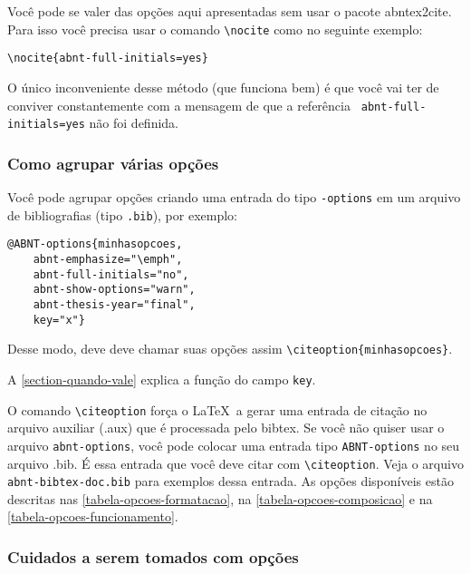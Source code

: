 \documentclass[a4paper]{ltxdoc}
\begin{document}
\DescribeMacro{\nocite}
Você pode se valer das opções aqui apresentadas sem usar o pacote
\textsf{abntex2cite}. Para isso você precisa usar o comando \verb+\nocite+ como
no seguinte exemplo:

\begin{verbatim}
\nocite{abnt-full-initials=yes}
\end{verbatim}

O único inconveniente desse método (que funciona bem) é que você vai ter de
conviver constantemente com a mensagem de que a referência \texttt{
abnt-full-initials=yes} não foi definida.

\subsubsection{Como agrupar várias opções}

\DescribeMacro{\citeoption}
Você pode agrupar opções criando uma entrada do tipo \texttt{\@ABNT-options}
em um arquivo de bibliografias (tipo \texttt{.bib}), por exemplo:

\begin{verbatim}
@ABNT-options{minhasopcoes,
	abnt-emphasize="\emph",
	abnt-full-initials="no",
	abnt-show-options="warn",
	abnt-thesis-year="final",
	key="x"}
\end{verbatim}

Desse modo, deve deve chamar suas opções assim \verb+\citeoption{minhasopcoes}+.

A \autoref{section-quando-vale} explica a função do campo \texttt{key}.


O comando \verb+\citeoption+ força o \LaTeX\ a gerar uma entrada de citação no
arquivo auxiliar (.aux) que é processada pelo \textsf{bibtex}. Se você não
quiser usar o arquivo \texttt{abnt-options}, você pode colocar uma entrada tipo
\texttt{ABNT-options} no seu arquivo .bib. É essa entrada que você deve citar com
\verb+\citeoption+. Veja o arquivo \texttt{abnt-bibtex-doc.bib} para exemplos dessa
entrada. As opções disponíveis estão descritas nas
\autoref{tabela-opcoes-formatacao}, na \autoref{tabela-opcoes-composicao} e na
\autoref{tabela-opcoes-funcionamento}.

\subsubsection{Cuidados a serem tomados com opções}
\end{document}
